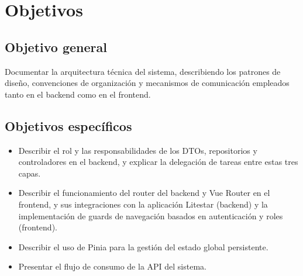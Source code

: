 \section{Objetivos}

\subsection{Objetivo general}

Documentar la arquitectura técnica del sistema, describiendo los patrones de diseño, 
convenciones de organización y mecanismos de comunicación empleados tanto en el 
backend como en el frontend.

\subsection{Objetivos específicos}

\begin{itemize}
	\item Describir el rol y las responsabilidades de los DTOs, repositorios y 
	controladores en el backend, y explicar la delegación de tareas entre estas 
	tres capas.
	
	\item Describir el funcionamiento del router del backend y Vue Router en el frontend, y sus integraciones con la 
	aplicación Litestar (backend) y la implementación de 
	guards de navegación basados en autenticación y roles (frontend).
	
	\item Describir el uso de Pinia para la gestión del estado 
	global persistente.
	
	\item Presentar el flujo de consumo de la API del sistema.
\end{itemize}